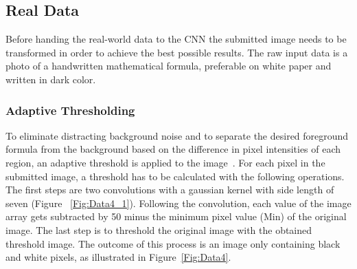 \documentclass[@CLASSOPTIONS@]{tumarticle}
\begin{document}
\subsection{Real Data}
\label{subsec:realdata}
Before handing the real-world data to the CNN the submitted image needs
to be transformed in order to achieve the best possible results.
The raw input data is a photo of a handwritten mathematical formula, preferable on white paper
and written in dark color.

\subsubsection{Adaptive Thresholding}

To eliminate distracting background noise and to separate the desired foreground formula
from the background based on the difference in pixel intensities of each region,
an adaptive threshold is applied to the image~\cite{threshold}.
For each pixel in the submitted image, a threshold has to be calculated with the following operations.
The first steps are two convolutions with a gaussian kernel with side length of seven (Figure ~\ref{Fig:Data4_1}).
Following the convolution, each value of the image array gets subtracted by 50 minus the minimum
pixel value (Min) of the original image.
The last step is to threshold the original image with the obtained threshold image.
The outcome of this process is an image only containing black and white pixels, as illustrated in Figure~\ref{Fig:Data4}.
\end{document}
